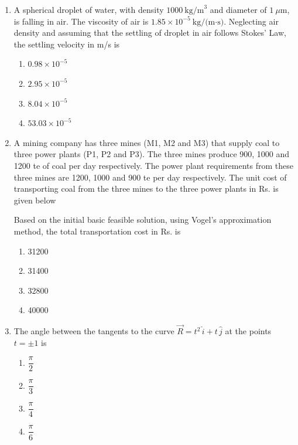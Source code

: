 \documentclass[journal]{IEEEtran}
\begin{document}
\begin{enumerate}[leftmargin=0pt]
\item A spherical droplet of water, with density $1000~\text{kg/m}^3$ and diameter of $1~\mu\text{m}$, is falling in air. The viscosity of air is $1.85\times10^{-5}~\text{kg/(m·s)}$. Neglecting air density and assuming that the settling of droplet in air follows Stokes’ Law, the settling velocity in m/s is
\begin{multicols}{2}
\begin{enumerate}[label=(\Alph*),itemsep=0pt,topsep=2pt]
  \item $0.98\times10^{-5}$
  \item $2.95\times10^{-5}$
  \item $8.04\times10^{-5}$
  \item $53.03\times10^{-5}$
\end{enumerate}
\end{multicols}
\hfill{}


\item A mining company has three mines (M1, M2 and M3) that supply coal to three
power plants (P1, P2 and P3). The three mines produce 900, 1000 and 1200 te of
coal per day respectively. The power plant requirements from these three mines
are 1200, 1000 and 900 te per day respectively. The unit cost of transporting
coal from the three mines to the three power plants in Rs. is given below


Based on the initial basic feasible solution, using Vogel’s approximation
method, the total transportation cost in Rs. is

\begin{multicols}{2}
\begin{enumerate}[label=(\Alph*),itemsep=0pt,topsep=2pt]
\item 31200
\item 31400
\item 32800
\item 40000
\end{enumerate}
\end{multicols}
\hfill{}

\item The angle between the tangents to the curve $\vec{R}=t^{2}\,\hat{i}+t\,\hat{j}$ at the points $t=\pm 1$ is
\begin{multicols}{2}
\begin{enumerate}[label=(\Alph*),itemsep=0pt,topsep=2pt]
  \item $\dfrac{\pi}{2}$
  \item $\dfrac{\pi}{3}$
  \item $\dfrac{\pi}{4}$
  \item $\dfrac{\pi}{6}$
\end{enumerate}
\end{multicols}
\hfill{}


\end{enumerate}
\end{document}
